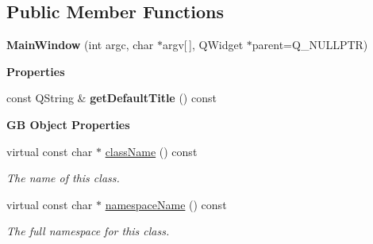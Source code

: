\subsection*{Public Member Functions}
\begin{DoxyCompactItemize}
\item 
\mbox{\label{classrev_1_1_main_window_a0386d66da2fbb916f0e1918ecff45680}} 
{\bfseries Main\+Window} (int argc, char $\ast$argv\mbox{[}$\,$\mbox{]}, Q\+Widget $\ast$parent=Q\+\_\+\+N\+U\+L\+L\+P\+TR)
\end{DoxyCompactItemize}
\begin{Indent}\textbf{ Properties}\par
\begin{DoxyCompactItemize}
\item 
\mbox{\label{classrev_1_1_main_window_a55fea9957874085ac7420c887f5ffbd3}} 
const Q\+String \& {\bfseries get\+Default\+Title} () const
\end{DoxyCompactItemize}
\end{Indent}
\begin{Indent}\textbf{ GB Object Properties}\par
\begin{DoxyCompactItemize}
\item 
virtual const char $\ast$ \mbox{\hyperlink{classrev_1_1_main_window_a3b8a0c921c8413553567f87a23861ad9}{class\+Name}} () const
\begin{DoxyCompactList}\small\item\em The name of this class. \end{DoxyCompactList}\item 
virtual const char $\ast$ \mbox{\hyperlink{classrev_1_1_main_window_a3d38cd81c10da2fcb09922c9d4dfd990}{namespace\+Name}} () const
\begin{DoxyCompactList}\small\item\em The full namespace for this class. \end{DoxyCompactList}\end{DoxyCompactItemize}
\end{Indent}
